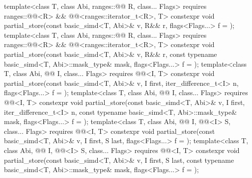 \begin{itemdecl}
template<class T, class Abi, ranges::@@ R, class... Flags>
  requires ranges::@@<R> && @@<ranges::iterator_t<R>, T>
  constexpr void partial_store(const basic_simd<T, Abi>& v, R&& r, flags<Flags...> f = {});
template<class T, class Abi, ranges::@@ R, class... Flags>
  requires ranges::@@<R> && @@<ranges::iterator_t<R>, T>
  constexpr void partial_store(const basic_simd<T, Abi>& v, R&& r,
    const typename basic_simd<T, Abi>::mask_type& mask, flags<Flags...> f = {});
template<class T, class Abi, @@ I, class... Flags>
  requires @@<I, T>
  constexpr void partial_store(const basic_simd<T, Abi>& v, I first, iter_difference_t<I> n,
                               flags<Flags...> f = {});
template<class T, class Abi, @@ I, class... Flags>
  requires @@<I, T>
  constexpr void partial_store(const basic_simd<T, Abi>& v, I first, iter_difference_t<I> n,
    const typename basic_simd<T, Abi>::mask_type& mask, flags<Flags...> f = {});
template<class T, class Abi, @@ I, @@<I> S, class... Flags>
  requires @@<I, T>
  constexpr void partial_store(const basic_simd<T, Abi>& v, I first, S last,
                               flags<Flags...> f = {});
template<class T, class Abi, @@ I, @@<I> S, class... Flags>
  requires @@<I, T>
  constexpr void partial_store(const basic_simd<T, Abi>& v, I first, S last,
    const typename basic_simd<T, Abi>::mask_type& mask, flags<Flags...> f = {});
\end{itemdecl}

